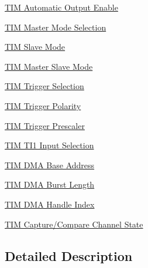 \begin{DoxyCompactItemize}
\item 
\hyperlink{group___t_i_m___a_o_e___bit___set___reset}{T\+I\+M Automatic Output Enable}
\item 
\hyperlink{group___t_i_m___master___mode___selection}{T\+I\+M Master Mode Selection}
\item 
\hyperlink{group___t_i_m___slave___mode}{T\+I\+M Slave Mode}
\item 
\hyperlink{group___t_i_m___master___slave___mode}{T\+I\+M Master Slave Mode}
\item 
\hyperlink{group___t_i_m___trigger___selection}{T\+I\+M Trigger Selection}
\item 
\hyperlink{group___t_i_m___trigger___polarity}{T\+I\+M Trigger Polarity}
\item 
\hyperlink{group___t_i_m___trigger___prescaler}{T\+I\+M Trigger Prescaler}
\item 
\hyperlink{group___t_i_m___t_i1___selection}{T\+I\+M T\+I1 Input Selection}
\item 
\hyperlink{group___t_i_m___d_m_a___base__address}{T\+I\+M D\+M\+A Base Address}
\item 
\hyperlink{group___t_i_m___d_m_a___burst___length}{T\+I\+M D\+M\+A Burst Length}
\item 
\hyperlink{group___t_i_m___d_m_a___handle__index}{T\+I\+M D\+M\+A Handle Index}
\item 
\hyperlink{group___t_i_m___channel___c_c___state}{T\+I\+M Capture/\+Compare Channel State}
\end{DoxyCompactItemize}


\subsection{Detailed Description}
